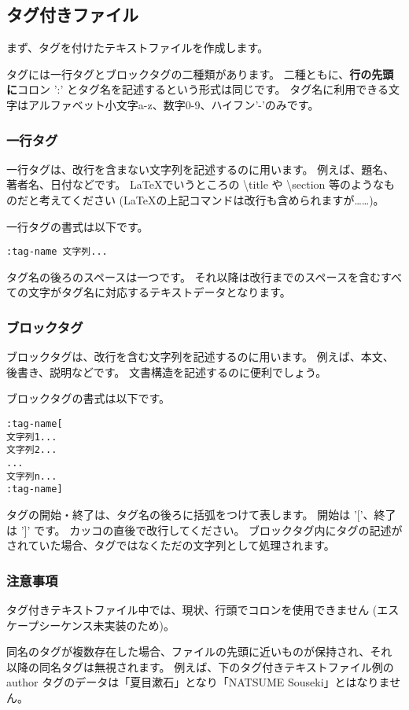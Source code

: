 \documentclass[a4j]{jsarticle}
\begin{document}
\subsection{タグ付きファイル}
まず、タグを付けたテキストファイルを作成します。


タグには一行タグとブロックタグの二種類があります。
二種ともに、\textbf{行の先頭に}コロン ':' とタグ名を記述するという形式は同じです。
タグ名に利用できる文字はアルファベット小文字a-z、数字0-9、ハイフン'-'のみです。


\subsubsection{一行タグ}
一行タグは、改行を含まない文字列を記述するのに用います。
例えば、題名、著者名、日付などです。
\LaTeX でいうところの \textbackslash title や \textbackslash section 等のようなものだと考えてください (\LaTeX の上記コマンドは改行も含められますが……)。

一行タグの書式は以下です。
\begin{lstlisting}[caption=一行タグの書式]
:tag-name 文字列...
\end{lstlisting}
タグ名の後ろのスペースは一つです。
それ以降は改行までのスペースを含むすべての文字がタグ名に対応するテキストデータとなります。


\subsubsection{ブロックタグ}
ブロックタグは、改行を含む文字列を記述するのに用います。
例えば、本文、後書き、説明などです。
文書構造を記述するのに便利でしょう。

ブロックタグの書式は以下です。
\begin{lstlisting}[caption=ブロックタグの書式]
:tag-name[
文字列1...
文字列2...
...
文字列n...
:tag-name]
\end{lstlisting}
タグの開始・終了は、タグ名の後ろに括弧をつけて表します。
開始は '['、終了は ']' です。
カッコの直後で改行してください。
ブロックタグ内にタグの記述がされていた場合、タグではなくただの文字列として処理されます。


\subsubsection{注意事項}
タグ付きテキストファイル中では、現状、行頭でコロンを使用できません 
(エスケープシーケンス未実装のため)。

同名のタグが複数存在した場合、ファイルの先頭に近いものが保持され、それ以降の同名タグは無視されます。
例えば、下のタグ付きテキストファイル例の author タグのデータは「夏目漱石」となり「NATSUME Souseki」とはなりません。
\end{document}
